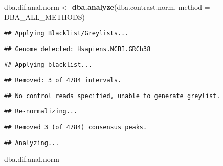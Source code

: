\documentclass[
]{article}
\newenvironment{Shaded}{\begin{snugshade}}{\end{snugshade}}
\newcommand{\DataTypeTok}[1]{\textcolor[rgb]{0.13,0.29,0.53}{#1}}
\newcommand{\KeywordTok}[1]{\textcolor[rgb]{0.13,0.29,0.53}{\textbf{#1}}}
\newcommand{\NormalTok}[1]{#1}
\newcommand{\StringTok}[1]{\textcolor[rgb]{0.31,0.60,0.02}{#1}}
\begin{document}
\begin{Shaded}
\begin{Highlighting}[]
\NormalTok{dba.dif.anal.norm <-}\StringTok{ }\KeywordTok{dba.analyze}\NormalTok{(dba.contrast.norm, }\DataTypeTok{method =}\NormalTok{ DBA_ALL_METHODS)}
\end{Highlighting}
\end{Shaded}

\begin{verbatim}
## Applying Blacklist/Greylists...
\end{verbatim}

\begin{verbatim}
## Genome detected: Hsapiens.NCBI.GRCh38
\end{verbatim}

\begin{verbatim}
## Applying blacklist...
\end{verbatim}

\begin{verbatim}
## Removed: 3 of 4784 intervals.
\end{verbatim}

\begin{verbatim}
## No control reads specified, unable to generate greylist.
\end{verbatim}

\begin{verbatim}
## Re-normalizing...
\end{verbatim}

\begin{verbatim}
## Removed 3 (of 4784) consensus peaks.
\end{verbatim}

\begin{verbatim}
## Analyzing...
\end{verbatim}

\begin{Shaded}
\begin{Highlighting}[]
\NormalTok{dba.dif.anal.norm}
\end{Highlighting}
\end{Shaded}
\end{document}
